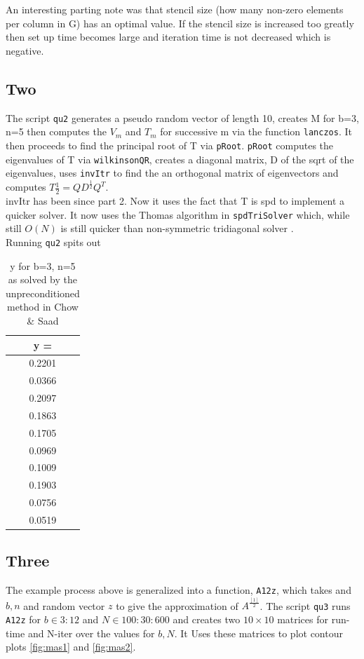 \documentclass[paper=a4, fontsize=12pt]{scrartcl} %
\numberwithin{equation}{section}       %
\numberwithin{figure}{section}         %
\numberwithin{table}{section}          %
\begin{document}
An interesting parting note was that stencil size (how many non-zero elements per column in G) has an optimal value. If the stencil size is increased too greatly then set up time becomes large and iteration time is not decreased which is negative.

\subsection{Two}
The script \texttt{qu2} generates a pseudo random vector of length 10, creates M for b=3, n=5 then computes the $V_m$ and $T_m$ for successive m via the function \texttt{lanczos}. It then proceeds to find the principal root of T via \texttt{pRoot}. \texttt{pRoot} computes the eigenvalues of T via \texttt{wilkinsonQR}, creates a diagonal matrix, D of the sqrt of the eigenvalues, uses \texttt{invItr} to find the an orthogonal matrix of eigenvectors and computes $T{\frac{1}{2}} = Q D^{\frac{1}{2}} Q^T$. \\
invItr has been since part 2. Now it uses the fact that T is spd to implement a quicker solver. It now uses the Thomas algorithm in \texttt{spdTriSolver} which, while still $O(N)$ is still quicker than non-symmetric tridiagonal solver \cite{3}. \\ 

Running \texttt{qu2} spits out 

\begin{table}
	\begin{center}
		\begin{tabular}{c}

			y = \\
			\hline
			    0.2201\\
			    0.0366\\
			    0.2097\\
			    0.1863\\
			    0.1705\\
			    0.0969\\
			    0.1009\\
			    0.1903\\
			    0.0756\\
			    0.0519\\
					
		\end{tabular}
	\end{center}
	\caption{y for b=3, n=5 as solved by the unpreconditioned method in Chow \& Saad}
	\label{table:3}
\end{table}

\subsection{Three}
The example process above is generalized into a function, \texttt{A12z}, which takes and $b, n$ and random vector $z$ to give the approximation of $A^{\frac{[1]}{2}}$. The script \texttt{qu3} runs \texttt{A12z} for $b \in 3:12$ and $N \in 100:30:600$ and creates two $10\times 10$ matrices for run-time and N-iter over the values for $b, N$. It Uses these matrices to plot contour plots \ref{fig:mas1} and \ref{fig:mas2}. 
\end{document}
